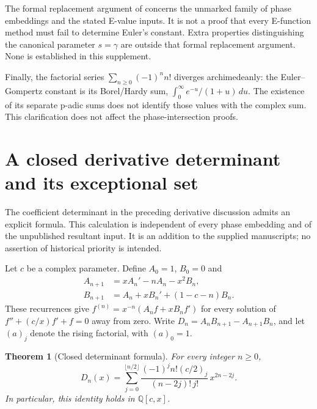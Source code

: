 \documentclass[11pt,a4paper]{article}
\newtheorem{theorem}{Theorem}[section]
\theoremstyle{definition}\newtheorem{definition}[theorem]{Definition}
\theoremstyle{remark}\newtheorem{remark}[theorem]{Remark}
\begin{document}
The formal replacement argument of \cite{WL} concerns the unmarked
family of phase embeddings and the stated E-value inputs. It is not a
proof that every E-function method must fail to determine Euler's
constant. Extra properties distinguishing the canonical parameter
$s=\gamma$ are outside that formal replacement argument. None is
established in this supplement.

Finally, the factorial series $\sum_{n\ge0}(-1)^nn!$ diverges
archimedeanly: the Euler--Gompertz constant is its Borel/Hardy sum,
$\int_0^\infty e^{-u}/(1+u)\,du$. The existence of its separate p-adic
sums does not identify those values with the complex sum. This
clarification does not affect the phase-intersection proofs.

\section{A closed derivative determinant and its exceptional set}
\label{det:section}

The coefficient determinant in the preceding derivative discussion admits
an explicit formula.  This calculation is independent of every phase
embedding and of the unpublished resultant input.  It is an addition to
the supplied manuscripts; no assertion of historical priority is intended.

Let $c$ be a complex parameter.  Define $A_0=1$, $B_0=0$ and
\begin{align}
 A_{n+1}&=xA_n'-nA_n-x^2B_n,\label{det:AB-a}\\
 B_{n+1}&=A_n+xB_n'+(1-c-n)B_n.\label{det:AB-b}
\end{align}
These recurrences give
$f^{(n)}=x^{-n}(A_nf+xB_nf')$ for every solution of
$f''+(c/x)f'+f=0$ away from zero.  Write
$D_n=A_nB_{n+1}-A_{n+1}B_n$, and let $(a)_j$ denote the rising factorial,
with $(a)_0=1$.

\begin{theorem}[Closed determinant formula]\label{det:closed}
For every integer $n\ge0$,
\begin{equation}\label{det:formula}
 D_n(x)=\sum_{j=0}^{\lfloor n/2\rfloor}
 \frac{(-1)^j n!(c/2)_j}{(n-2j)!\,j!}\,x^{2n-2j}.
\end{equation}
In particular, this identity holds in $\mathbb Q[c,x]$.
\end{theorem}
\end{document}
